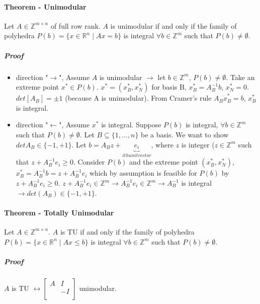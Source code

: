 \documentclass[main]{subfiles}
\begin{document}
\paragraph{Theorem - Unimodular}
Let $A \in \mathbb{Z}^{m \times n}$ of full row rank. $A$ is unimodular if and only if the family of polyhedra $P(b) = \{ x \in \mathbb{R}^{n} \mid Ax = b \}$ is integral $\forall b \in \mathbb{Z}^{m}$ such that $P(b) \neq \emptyset$.

\subparagraph{Proof}
\begin{itemize}
\item direction "$\rightarrow$", Assume $A$ is unimodular $\rightarrow$ let $b \in \mathbb{Z}^{m}$, $P(b) \neq \emptyset$. Take an extreme point $x^{*} \in P(b)$. $x^{*} = (x^{*}_{B}, x^{*}_{N})$ for basis B, $x^{*}_{B} = A^{-1}_{B}b$, $x^{*}_{N} = 0$.
$det[A_{B}] = \pm 1$ (because A is unimodular). From Cramer's rule $A_{B} \dot x^{*}_{B} = b$, $x^{*}_{B}$ is integral.

\item direction "$\leftarrow$", Assume $x^{*}$ is integral. Suppose $P(b)$ is integral, $\forall b \in \mathbb{Z}^{m}$ such that $P(b) \neq \emptyset$. Let $B \subseteq \{1, \dots, n\}$ be a basis. We want to show $det A_{B} \in \{-1, +1\}$.
Let $b = A_{B}z + \underbrace{e_{i}}_{ith unit vector}$, where $z$ is integer ($z \in \mathbb{Z}^{m}$ such that $z + A^{-1}_{B} e_{i} \geq 0$. Consider $P(b)$ and the extreme point $(x^{*}_{B}, x^{*}_{N})$, $x^{*}_{B} = A^{-1}_{B}b = z + A^{-1}_{B} e_{i}$ which by assumption is feasible for $P(b)$ by $z + A^{-1}_{B} e_{i} \geq 0$. $z + A^{-1}_{B} e_{i} \in \mathbb{Z}^{m} \rightarrow A^{-1}_{B} e_{i} \in \mathbb{Z}^{m} \rightarrow A^{-1}_{B}$ is integral $\rightarrow det(A_{B}) \in \{-1, +1\}$.
\end{itemize}

\paragraph{Theorem - Totally Unimodular}
Let $A \in \mathbb{Z}^{m \times n}$. $A$ is TU if and only if the family of polyhedra $P(b) = \{ x \in \mathbb{R}^{n} \mid Ax \leq b \}$ is integral $\forall b \in \mathbb{Z}^{m}$ such that $P(b) \neq \emptyset$.

\subparagraph{Proof}
$A$ is TU $\leftrightarrow \begin{bmatrix}
A & I\\
 & -I\\
\end{bmatrix}$ unimodular.
\end{document}
